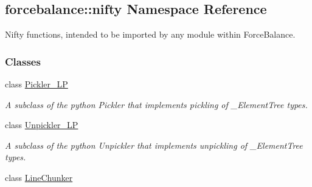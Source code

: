 \hypertarget{namespaceforcebalance_1_1nifty}{\subsection{forcebalance\-:\-:nifty \-Namespace \-Reference}
\label{namespaceforcebalance_1_1nifty}
}


\-Nifty functions, intended to be imported by any module within \-Force\-Balance.  


\subsubsection*{\-Classes}
\begin{DoxyCompactItemize}
\item 
class \hyperlink{classforcebalance_1_1nifty_1_1Pickler__LP}{\-Pickler\-\_\-\-L\-P}
\begin{DoxyCompactList}\small\item\em \-A subclass of the python \-Pickler that implements pickling of \-\_\-\-Element\-Tree types. \end{DoxyCompactList}\item 
class \hyperlink{classforcebalance_1_1nifty_1_1Unpickler__LP}{\-Unpickler\-\_\-\-L\-P}
\begin{DoxyCompactList}\small\item\em \-A subclass of the python \-Unpickler that implements unpickling of \-\_\-\-Element\-Tree types. \end{DoxyCompactList}\item 
class \hyperlink{classforcebalance_1_1nifty_1_1LineChunker}{\-Line\-Chunker}
\end{DoxyCompactItemize}
